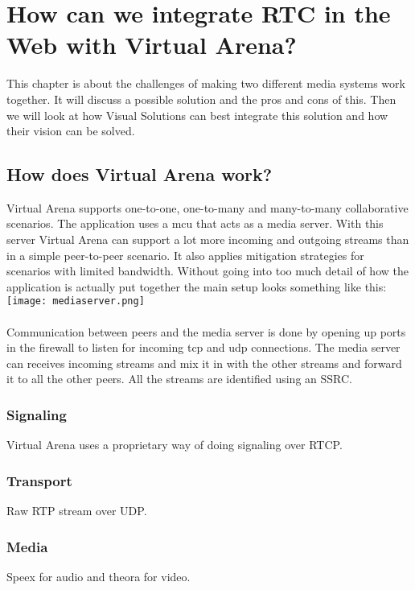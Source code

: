 
\section{How can we integrate RTC in the Web with Virtual Arena?}

This chapter is about the challenges of making two different media systems work together. It will discuss a possible solution and the pros and cons of this. Then we will look at how Visual Solutions can best integrate this solution and how their vision can be solved.

\subsection{How does Virtual Arena work?}

Virtual Arena supports one-to-one, one-to-many and many-to-many collaborative scenarios. The application uses a \gls{mcu} that acts as a media server. With this server Virtual Arena can support a lot more incoming and outgoing streams than in a simple peer-to-peer scenario. It also applies mitigation strategies for scenarios with limited bandwidth. Without going into too much detail of how the application is actually put together the main setup looks something like this: 
\\
\texttt{[image: mediaserver.png]}
\\
\\
Communication between peers and the media server is done by opening up ports in the firewall to listen for incoming tcp and udp connections. The media server can receives incoming streams and mix it in with the other streams and forward it to all the other peers. All the streams are identified using an SSRC.

\subsubsection{Signaling}
Virtual Arena uses a proprietary way of doing signaling over RTCP.

\subsubsection{Transport}
Raw RTP stream over UDP.

\subsubsection{Media}
Speex for audio and theora for video.


